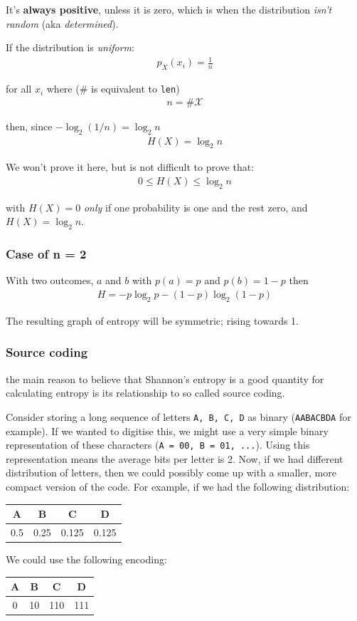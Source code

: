 \documentclass[11pt,a4paper,titlepage,dvipsnames,cmyk]{scrartcl}
\begin{document}
It's \textbf{always positive}, unless it is zero, which is when the distribution \textit{isn't random} (aka \textit{determined}).

If the distribution is \textit{uniform}:
\begin{align*}
p_X(x_i) = \frac{1}{n}
\end{align*}

for all $x_i$ where ($\#$ is equivalent to \texttt{len})
\begin{align*}
n = \#\mathcal{X}
\end{align*}

then, since $-\log_2(1/n) = \log_2n$
\begin{align*}
H(X) = \log_2n
\end{align*}

We won't prove it here, but is not difficult to prove that:
\begin{align*}
0 \le H(X) \le \log_2n
\end{align*}

with $H(X) = 0$ \textit{only} if one probability is one and the rest zero, and $H(X) = \log_2 n$.

\subsubsection{Case of n = 2}
With two outcomes, $a$ and $b$ with $p(a) = p$ and $p(b) = 1-p$ then
\begin{align*}
H = -p\log_2 p-(1-p)\log_2(1-p)
\end{align*}

The resulting graph of entropy will be symmetric; rising towards 1.

\subsubsection{Source coding}
the main reason to believe that Shannon's entropy is a good quantity for calculating entropy is its relationship to so called source coding.

Consider storing a long sequence of letters \texttt{A, B, C, D} as binary (\texttt{AABACBDA} for example). If we wanted to digitise this, we might use a very simple binary representation of these characters (\texttt{A = 00, B = 01, ...}). Using this representation means the average bits per letter is 2. Now, if we had different distribution of letters, then we could possibly come up with a smaller, more compact version of the code. For example, if we had the following distribution:
\begin{center}
    \begin{tabular}{cccc}
        A & B & C & D \\ \midrule
        0.5 & 0.25 & 0.125 & 0.125
    \end{tabular}
\end{center}
We could use the following encoding:
\begin{center}
    \begin{tabular}{cccc}
        A & B & C & D \\ \midrule
        0 & 10 & 110 & 111
    \end{tabular}
\end{center}
\end{document}
